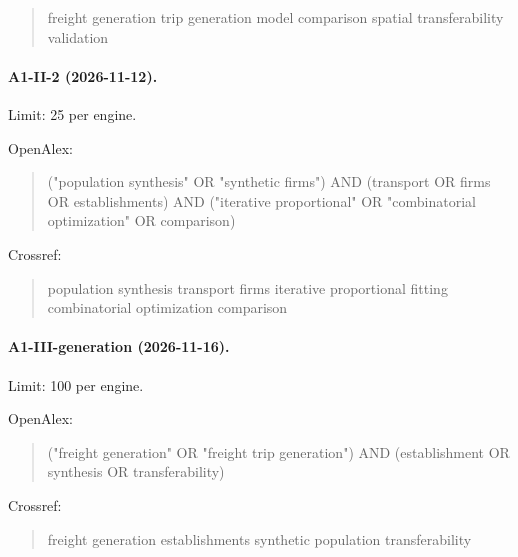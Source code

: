 \begin{quote}\footnotesize\ttfamily\raggedright

freight generation trip generation model comparison spatial transferability validation

\end{quote}

\paragraph{A1-II-2 (2026-11-12).} Limit: 25 per engine.

\noindent OpenAlex:

\begin{quote}\footnotesize\ttfamily\raggedright

("population synthesis" OR "synthetic firms") AND (transport OR firms OR establishments) AND ("iterative proportional" OR "combinatorial optimization" OR comparison)

\end{quote}

\noindent Crossref:

\begin{quote}\footnotesize\ttfamily\raggedright

population synthesis transport firms iterative proportional fitting combinatorial optimization comparison

\end{quote}

\paragraph{A1-III-generation (2026-11-16).} Limit: 100 per engine.

\noindent OpenAlex:

\begin{quote}\footnotesize\ttfamily\raggedright

("freight generation" OR "freight trip generation") AND (establishment OR synthesis OR transferability)

\end{quote}

\noindent Crossref:

\begin{quote}\footnotesize\ttfamily\raggedright

freight generation establishments synthetic population transferability

\end{quote}

